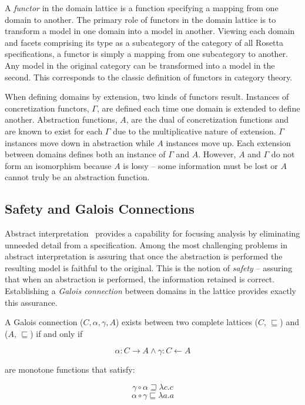 \documentclass[12pt]{article}
\begin{document}
A \emph{functor} in the domain lattice is a function specifying a mapping from one domain
to another.  The primary role of functors in the domain lattice is to transform a model in
one domain into a model in another.  Viewing each domain and facets comprising its type as
a subcategory of the category of all Rosetta specifications, a functor is simply a mapping
from one subcategory to another.  Any model in the original category can be transformed
into a model in the second.  This corresponds to the classic definition of functors in
category theory.

When defining domains by extension, two kinds of functors result.
Instances of concretization functors, $\Gamma$, are defined each time
one domain is extended to define another.  Abstraction functions, $A$,
are the dual of concretization functions and are known to exist for
each $\Gamma$ due to the multiplicative nature of extension.  $\Gamma$
instances move down in abstraction while $A$ instances move up.  Each
extension between domains defines both an instance of $\Gamma$ and
$A$.  However, $A$ and $\Gamma$ do not form an isomorphism because $A$
is lossy -- some information must be lost or $A$ cannot truly be an
abstraction function.

\subsection{Safety and Galois Connections}

Abstract interpretation~\cite{Cousot:00:Abstract-Interp} provides a
capability for focusing analysis by eliminating unneeded detail from a
specification.  Among the most challenging problems in abstract
interpretation is assuring that once the abstraction is performed the
resulting model is faithful to the original. This is the notion of
\emph{safety} -- assuring that when an abstraction is performed, the
information retained is correct.  Establishing a \emph{Galois
  connection} \cite{Nielson:05:Principles-of-P} between domains in the
lattice provides exactly this assurance.

A Galois connection ($C,\alpha,\gamma,A$) exists between two complete
lattices ($C$, $\sqsubseteq$) and ($A$, $\sqsubseteq$) if and only if

\[\alpha:C \rightarrow A \wedge \gamma:C \leftarrow A\]

\noindent are monotone functions that satisfy:

\begin{equation}
\label{eq:c1}
\gamma \circ \alpha \sqsupseteq \lambda c.c
\end{equation}
\begin{equation}
\label{eq:c2}
\alpha \circ \gamma \sqsubseteq \lambda a.a
\end{equation}
\end{document}
